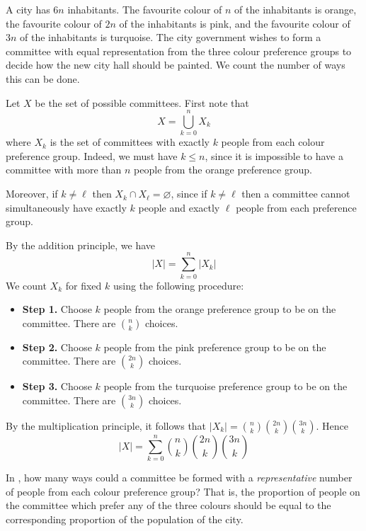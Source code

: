 \begin{example}
\label{exCityColour}
A city has $6n$ inhabitants. The favourite colour of $n$ of the inhabitants is orange, the favourite colour of $2n$ of the inhabitants is pink, and the favourite colour of $3n$ of the inhabitants is turquoise. The city government wishes to form a committee with equal representation from the three colour preference groups to decide how the new city hall should be painted. We count the number of ways this can be done.

Let $X$ be the set of possible committees. First note that
\[ X = \bigcup_{k=0}^n X_k \]
where $X_k$ is the set of committees with exactly $k$ people from each colour preference group. Indeed, we must have $k \le n$, since it is impossible to have a committee with more than $n$ people from the orange preference group.

Moreover, if $k \ne \ell$ then $X_k \cap X_{\ell} = \varnothing$, since if $k \ne \ell$ then a committee cannot simultaneously have exactly $k$ people and exactly $\ell$ people from each preference group.

By the addition principle, we have
\[ |X| = \sum_{k=0}^n |X_k| \]
We count $X_k$ for fixed $k$ using the following procedure:
\begin{itemize}
\item \textbf{Step 1.} Choose $k$ people from the orange preference group to be on the committee. There are $\binom{n}{k}$ choices.
\item \textbf{Step 2.} Choose $k$ people from the pink preference group to be on the committee. There are $\binom{2n}{k}$ choices.
\item \textbf{Step 3.} Choose $k$ people from the turquoise preference group to be on the committee. There are $\binom{3n}{k}$ choices.
\end{itemize}
By the multiplication principle, it follows that $|X_k| = \binom{n}{k} \binom{2n}{k} \binom{3n}{k}$. Hence
\[ |X| = \sum_{k=0}^n \binom{n}{k} \binom{2n}{k} \binom{3n}{k} \]
\end{example}

\begin{exercise}
\label{exCityColourModified}
In , how many ways could a committee be formed with a \textit{representative} number of people from each colour preference group? That is, the proportion of people on the committee which prefer any of the three colours should be equal to the corresponding proportion of the population of the city.
\end{exercise}

